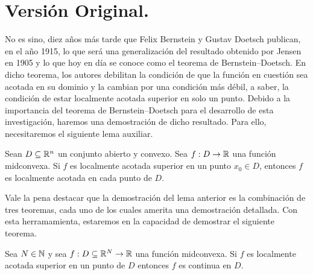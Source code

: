 \section{Versión Original.}
No es sino, diez años más tarde que Felix Bernstein y Gustav Doetsch publican,
en el año 1915, lo que será una generalización del resultado obtenido
por Jensen en 1905 y lo que hoy en día se conoce como el teorema de Bernstein--Doetsch. 
En dicho teorema, los autores debilitan la condición de que la función en cuestión
sea acotada en su dominio y la cambian por una condición más débil, a saber,
la condición de estar localmente acotada superior en solo un punto.
%
Debido a la importancia del teorema de Bernstein--Doetsch para el desarrollo
de esta investigación, haremos una demostración de dicho resultado. Para ello,
necesitaremos el siguiente lema auxiliar.
\begin{lemma}
\label{LLocUpBdd}
Sean $D\subseteq\mathbb{R}^n$ un conjunto abierto y convexo. Sea $f:D\to\mathbb{R}$ una función 
midconvexa.
Si $f$ es localmente acotada superior en un punto $x_0\in D$, entonces
$f$ es localmente acotada en cada punto de $D$.
\end{lemma}

Vale la pena destacar que la demostración del lema anterior es la 
combinación de tres teoremas, cada uno de los cuales amerita
una demostración detallada. Con esta herramamienta, estaremos en la 
capacidad de demostrar el siguiente teorema.

\begin{theorem}
\label{TBD15}
Sea $N\in\mathbb{N}$ y sea $f:D\subseteq\mathbb{R}^N\to\mathbb{R}$ una función midconvexa. Si
$f$ es localmente acotada superior en un punto de $D$ entonces 
$f$ es continua en $D$.
\end{theorem}

